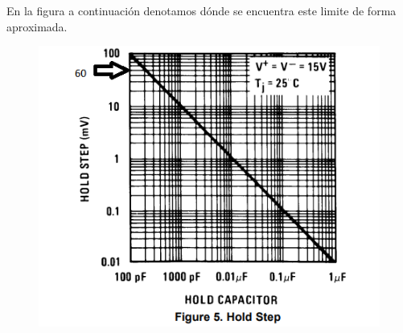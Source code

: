 En la figura a continuación denotamos dónde se encuentra este limite de forma aproximada. 
\begin{figure}[H]
	\centering
	\includegraphics[scale=0.7]{ImagenesEjercicio4/HoldStepMarcado}
	\caption{}
	\label{fig:holdstep}
\end{figure}

